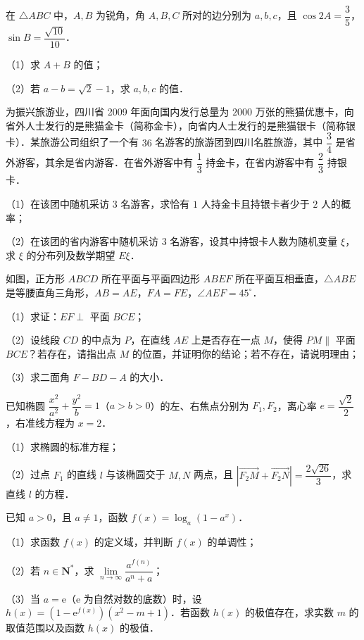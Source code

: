 \begin{question}
在 $\triangle ABC$ 中，$A,B$ 为锐角，角 $A,B,C$ 所对的边分别为 $a,b,c$，且 $\cos2A=\dfrac35$，$\sin B=\dfrac{\sqrt{10}}{10}$．

（1）求 $A+B$ 的值；

（2）若 $a-b=\sqrt2-1$，求 $a,b,c$ 的值．

\end{question}
\begin{question}
为振兴旅游业，四川省 2009 年面向国内发行总量为 $2000$ 万张的熊猫优惠卡，向省外人士发行的是熊猫金卡（简称金卡），向省内人士发行的是熊猫银卡（简称银卡）．某旅游公司组织了一个有 $36$ 名游客的旅游团到四川名胜旅游，其中 $\dfrac34$ 是省外游客，其余是省内游客．在省外游客中有 $\dfrac13$ 持金卡，在省内游客中有 $\dfrac23$ 持银卡．

（1）在该团中随机采访 $3$ 名游客，求恰有 $1$ 人持金卡且持银卡者少于 $2$ 人的概率；

（2）在该团的省内游客中随机采访 $3$ 名游客，设其中持银卡人数为随机变量 $\xi$，求 $\xi$ 的分布列及数学期望 $E\xi$．

\Needspace{0.4\textheight}
\end{question}
\begin{question}
如图，正方形 $ABCD$ 所在平面与平面四边形 $ABEF$ 所在平面互相垂直，$\triangle ABE$ 是等腰直角三角形，$AB=AE$，$FA=FE$，$\angle AEF=45^\circ$．
\nopagebreak[4]
\begin{center}\end{center}
\nopagebreak[4]
（1）求证：$EF\perp$ 平面 $BCE$；

（2）设线段 $CD$ 的中点为 $P$，在直线 $AE$ 上是否存在一点 $M$，使得 $PM\parallel$ 平面 $BCE$？若存在，请指出点 $M$ 的位置，并证明你的结论；若不存在，请说明理由；

（3）求二面角 $F-BD-A$ 的大小．

\end{question}
\begin{question}
已知椭圆 $\dfrac{x^2}{a^2}+\dfrac{y^2}{b}=1$（$a>b>0$）的左、右焦点分别为 $F_1,F_2$，离心率 $e=\dfrac{\sqrt2}{2}$，右准线方程为 $x=2$．

（1）求椭圆的标准方程；

（2）过点 $F_1$ 的直线 $l$ 与该椭圆交于 $M,N$ 两点，且 $\left|\overrightarrow{F_2M}+\overrightarrow{F_2N}\right|=\dfrac{2\sqrt{26}}{3}$，求直线 $l$ 的方程．

\end{question}
\begin{question}
已知 $a>0$，且 $a\neq1$，函数 $f(x)=\log_a(1-a^x)$．

（1）求函数 $f(x)$ 的定义域，并判断 $f(x)$ 的单调性；

（2）若 $n\in\mathbf N^*$，求 $\lim\limits_{n\to\infty}\dfrac{a^{f(n)}}{a^n+a}$；

（3）当 $a=\mathrm e$（$\mathrm e$ 为自然对数的底数）时，设 $h(x)=(1-\mathrm e^{f(x)})(x^2-m+1)$．若函数 $h(x)$ 的极值存在，求实数 $m$ 的取值范围以及函数 $h(x)$ 的极值．

\end{question}
